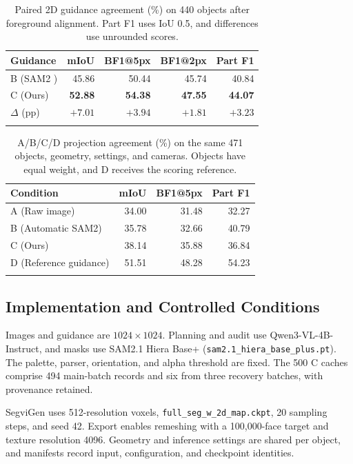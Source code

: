 \documentclass[pdflatex,sn-mathphys-ay]{sn-jnl}
\begin{document}
\begin{table}[t]
\caption{Paired 2D guidance agreement (\%) on 440 objects after foreground alignment. Part F1 uses IoU 0.5, and differences use unrounded scores.}
\label{tab:guidance2d}
\centering
\setlength{\tabcolsep}{5pt}
\begin{tabular}{@{}lrrrr@{}}
\toprule
Guidance & mIoU & BF1@5px & BF1@2px & Part F1\\
\midrule
B (SAM2 \citep{ravi2024sam2}) & 45.86 & 50.44 & 45.74 & 40.84\\
C (Ours) & \textbf{52.88} & \textbf{54.38} & \textbf{47.55} & \textbf{44.07}\\
$\Delta$ (pp) & $+7.01$ & $+3.94$ & $+1.81$ & $+3.23$\\
\botrule
\end{tabular}
\end{table}

\begin{table}[t]
\caption{A/B/C/D projection agreement (\%) on the same 471 objects, geometry, settings, and cameras. Objects have equal weight, and D receives the scoring reference.}
\label{tab:controlled}
\setlength{\tabcolsep}{6pt}
\begin{tabular}{@{}lrrr@{}}
\toprule
Condition & mIoU & BF1@5px & Part F1\\
\midrule
A (Raw image) & 34.00 & 31.48 & 32.27\\
B (Automatic SAM2) & 35.78 & 32.66 & 40.79\\
C (Ours) & 38.14 & 35.88 & 36.84\\
D (Reference guidance) & 51.51 & 48.28 & 54.23\\
\botrule
\end{tabular}
\end{table}

\subsection{Implementation and Controlled Conditions}
Images and guidance are $1024\times1024$. Planning and audit use Qwen3-VL-4B-Instruct, and masks use SAM2.1 Hiera Base+ (\texttt{sam2.1\_hiera\_base\_plus.pt}). The palette, parser, orientation, and alpha threshold are fixed. The 500 C caches comprise 494 main-batch records and six from three recovery batches, with provenance retained.

SegviGen uses 512-resolution voxels, \texttt{full\_seg\_w\_2d\_map.ckpt}, 20 sampling steps, and seed 42. Export enables remeshing with a 100,000-face target and texture resolution 4096. Geometry and inference settings are shared per object, and manifests record input, configuration, and checkpoint identities.
\end{document}
